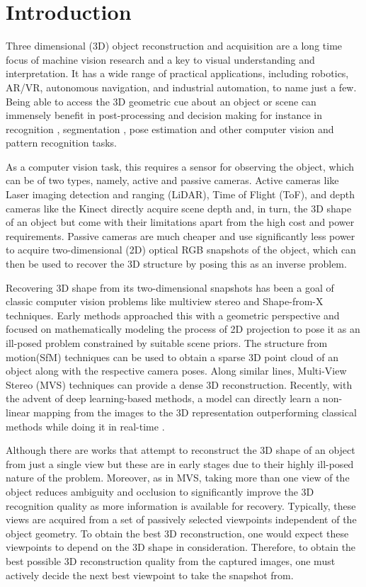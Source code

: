 \section{Introduction}
Three dimensional (3D) object reconstruction and acquisition are a long time focus of machine vision research and a key to visual understanding and interpretation. It has a wide range of practical applications, including robotics, AR/VR, autonomous navigation, and industrial automation, to name just a few.
Being able to access the 3D geometric cue about an object or scene can immensely benefit in post-processing and decision making for instance in recognition \cite{pontil1998support}, segmentation \cite{qi2017pointnet}, pose estimation \cite{andriluka2010monocular} and other computer vision and pattern recognition tasks.

As a computer vision task, this requires a sensor for observing the object, which can be of two types, namely, active and passive cameras.
Active cameras like Laser imaging detection and ranging (LiDAR), Time of Flight (ToF), and depth cameras like the Kinect directly acquire scene depth and, in turn, the 3D shape of an object but come with their limitations apart from the high cost and power requirements.
Passive cameras are much cheaper and use significantly less power to acquire two-dimensional (2D) optical RGB snapshots of the object, which can then be used to recover the 3D structure by posing this as an inverse problem.

Recovering 3D shape from its two-dimensional snapshots has been a goal of classic computer vision problems like multiview stereo and Shape-from-X techniques.
Early methods approached this with a geometric perspective and focused on mathematically modeling the process of 2D projection to pose it as an ill-posed problem \cite{hartley2003multiple} constrained by suitable scene priors.
The structure from motion(SfM) techniques can be used to obtain a sparse 3D point cloud of an object along with the respective camera poses.
Along similar lines, Multi-View Stereo (MVS) techniques can provide a dense 3D reconstruction.
Recently, with the advent of deep learning-based methods, a model can directly learn a non-linear mapping from the images to the 3D representation outperforming classical methods while doing it in real-time \cite{pix2vox}.

Although there are works that attempt to reconstruct the 3D shape of an object from just a single view but these are in early stages due to their highly ill-posed nature of the problem.
Moreover, as in MVS, taking more than one view of the object reduces ambiguity and occlusion to significantly improve the 3D recognition quality as more information is available for recovery.
Typically, these views are acquired from a set of passively selected viewpoints independent of the object geometry.
To obtain the best 3D reconstruction, one would expect these viewpoints to depend on the 3D shape in consideration.
Therefore, to obtain the best possible 3D reconstruction quality from the captured images, one must actively decide the next best viewpoint to take the snapshot from.

